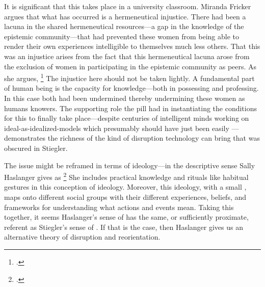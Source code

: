 \documentclass[letterpaper,notitlepage,12pt]{article}
\begin{document}
It is significant that this takes place in a university classroom. Miranda
Fricker argues that what has occurred is a hermeneutical injustice.
There had been a lacuna in the shared hermeneutical resources---a gap in the
knowledge of the epistemic community---that had prevented these women from
being able to render their own experiences intelligible to themselves much less
others.
That this was an injustice arises from the fact that this hermeneutical lacuna
arose from the exclusion of women in participating in the epistemic community as
peers.
As she argues, \footcite[p. 132]{fricker_epistemic_2011}
The injustice here should not be taken lightly.
A fundamental part of human being is the capacity for knowledge---both in
possessing and professing.
In this case both had been undermined thereby undermining these women as humans
 knowers.
The supporting role the pill had in instantiating the conditions for this to
finally take place---despite centuries of intelligent minds working on
ideal-as-idealized-models which presumably should have just been easily
---demonstrates the richness of the kind of disruption
technology can bring that was obscured in Stiegler.

The issue might be reframed in terms of ideology---in the descriptive sense
Sally Haslanger gives as \footcite[p. 75]{haslanger_but_2007}
She includes practical knowledge and rituals like habitual gestures in this
conception of ideology.
Moreover, this ideology, with a small , maps onto different social
groups with their different experiences, beliefs, and frameworks for
understanding what actions and events mean.
Taking this together, it seems Haslanger's sense of  has the 
same, or sufficiently proximate, referent as Stiegler's sense of
.
If that is the case, then Haslanger gives us an alternative theory of disruption
and reorientation.
\end{document}
